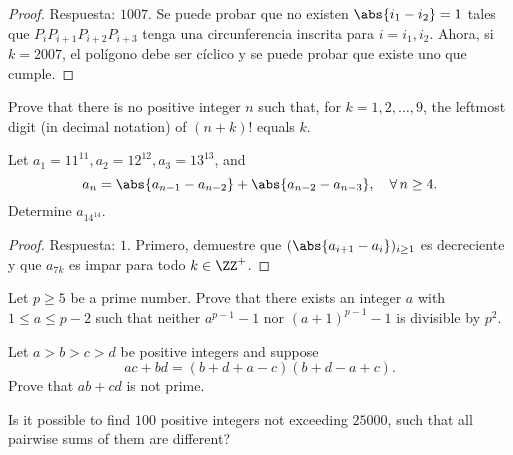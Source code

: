 \begin{proof}
	Respuesta: $1007$. Se puede probar que no existen $\abs{i_1-i_2}=1$ tales que $P_iP_{i+1}P_{i+2}P_{i+3}$ tenga una circunferencia inscrita para $i=i_1,i_2$. Ahora, si $k=2007$, el polígono debe ser cíclico y se puede probar que existe uno que cumple.
\end{proof}


\begin{probEG}[ISL 2001/N1]
	Prove that there is no positive integer $n$ such that, for $k=1,2,\dots,9$, the leftmost digit (in decimal notation) of $(n+k)!$ equals $k$.
\end{probEG}

\begin{probMR}[ISL 2001/N3]
	Let $a_1=11^{11},a_2=12^{12},a_3=13^{13}$, and
	\[a_n=\abs{a_{n-1}-a_{n-2}}+\abs{a_{n-2}-a_{n-3}},\quad\forall\,n\ge 4.\]
	Determine $a_{14^{14}}$.
\end{probMR}

\begin{proof}
	Respuesta: $1$. Primero, demuestre que $(\abs{a_{i+1}-a_i})_{i\ge 1}$ es decreciente y que $a_{7k}$ es impar para todo $k\in\ZZ^+$.
\end{proof}

\begin{problem}[ISL 2001/N4]
	Let $p\ge 5$ be a prime number. Prove that there exists an integer $a$ with $1\le a\le p-2$ such that neither $a^{p-1}-1$ nor $(a+1)^{p-1}-1$ is divisible by $p^2$.
\end{problem}

\begin{problem}[ISL 2001/N5]
	Let $a>b>c>d$ be positive integers and suppose
	\[ac+bd=(b+d+a-c)(b+d-a+c).\]
	Prove that $ab+cd$ is not prime.
\end{problem}

\begin{problem}[ISL 2001/N6]
	Is it possible to find $100$ positive integers not exceeding $25000$, such that all pairwise sums of them are different?
\end{problem}
